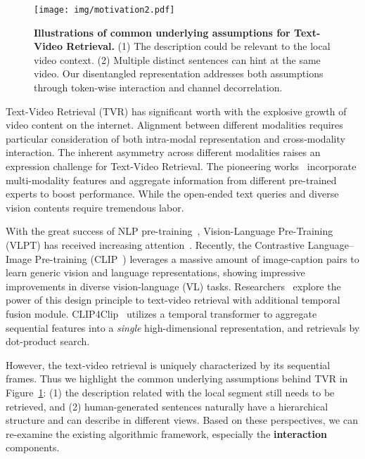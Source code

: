\documentclass[runningheads]{llncs}
\begin{document}
\begin{figure}[t]
\centering
\texttt{[image: img/motivation2.pdf]}
\vspace{-3mm}
\caption{\textbf{Illustrations of common underlying assumptions for Text-Video Retrieval.}  (1) The description could be relevant to the local video context. (2) Multiple distinct sentences can hint at the same video. Our disentangled representation addresses both assumptions through token-wise interaction and channel decorrelation. }
\vspace{-2mm}
\label{fig:intro}
\end{figure}

Text-Video Retrieval (TVR) has significant worth with the explosive growth of video content on the internet. 
Alignment between different modalities requires particular consideration of both intra-modal representation and cross-modality interaction.
The inherent asymmetry across different modalities raises an expression challenge for Text-Video Retrieval.
The pioneering works~\cite{mmt,ce} incorporate multi-modality features and aggregate information from different pre-trained experts to boost performance.
While the open-ended text queries and diverse vision contents require tremendous labor. 

With the great success of NLP pre-training~\cite{bert,roberta,bart,gpt,t5}, Vision-Language Pre-Training (VLPT) has received increasing attention~\cite{hero,clipbert,oscar,univl,frozen}.
Recently, the Contrastive Language–Image Pre-training (CLIP~\cite{clip}) leverages a massive amount of image-caption pairs to learn generic vision and language representations, showing impressive improvements in diverse vision-language (VL) tasks.
Researchers~\cite{sclip,frozen,clip4clip,clip2video,clip2tv} explore the power of this design principle to text-video retrieval with additional temporal fusion module.
CLIP4Clip~\cite{clip4clip} utilizes a temporal transformer to aggregate sequential features into a \textit{single} high-dimensional representation, and retrievals by dot-product search. 

However, the text-video retrieval is uniquely characterized by its sequential frames.
Thus we highlight the common underlying  assumptions behind TVR in Figure~\ref{fig:intro}:
(1) the description related with the local segment still needs to be retrieved, and
(2) human-generated sentences naturally have a hierarchical structure and can describe in different views.
Based on these perspectives, we can re-examine the existing algorithmic framework, especially the \textbf{interaction} components.
\end{document}
